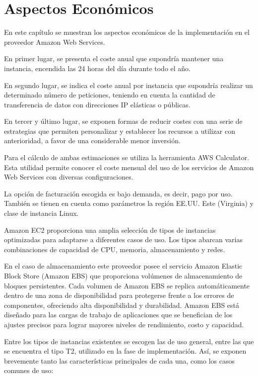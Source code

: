 \chapter{Aspectos Económicos}
\label{cha:economic}

En este capítulo se muestran los aspectos económicos de la implementación en el proveedor Amazon Web Services. 

En primer lugar, se presenta el coste anual que supondría mantener una instancia, encendida las 24 horas del día durante todo el año. 

En segundo lugar, se indica el coste anual por instancia que supondría realizar un determinado número de peticiones, teniendo en cuenta la cantidad de transferencia de datos con direcciones IP elásticas o públicas. 

En tercer y último lugar, se exponen formas de reducir costes con una serie de estrategias que permiten personalizar y establecer los recursos a utilizar con anterioridad, a favor de una considerable menor inversión.

Para el cálculo de ambas estimaciones se utiliza la herramienta AWS Calculator. Esta utilidad permite conocer el coste mensual del uso de los servicios de Amazon Web Services con diversas configuraciones.

La opción de facturación escogida es bajo demanda, es decir, pago por uso. También se tienen en cuenta como parámetros la región EE.UU. Este (Virginia) y clase de instancia Linux.

Amazon EC2 proporciona una amplia selección de tipos de instancias optimizadas para adaptarse a diferentes casos de uso. Los tipos abarcan varias combinaciones de capacidad de CPU, memoria, almacenamiento y redes. 

En el caso de almacenamiento este proveedor posee el servicio Amazon Elastic Block Store (Amazon EBS) que proporciona volúmenes de almacenamiento de bloques persistentes. Cada volumen de Amazon EBS se replica automáticamente dentro de una zona de disponibilidad para protegerse frente a los errores de componentes, ofreciendo alta disponibilidad y durabilidad. Amazon EBS está diseñado para las cargas de trabajo de aplicaciones que se benefician de los ajustes precisos para lograr mayores niveles de rendimiento, costo y capacidad.

Entre los tipos de instancias existentes se escogen las de uso general, entre las que se encuentra el tipo T2, utilizado en la fase de implementación. Así, se exponen brevemente tanto las características principales de cada una, como los casos comunes de uso:

